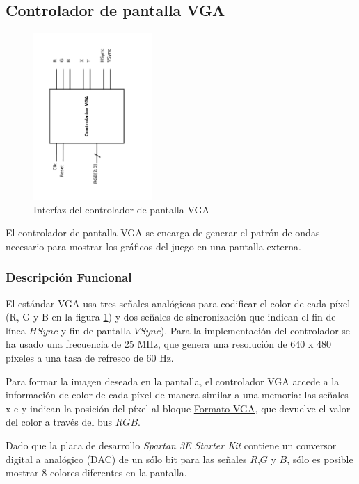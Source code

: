 \subsection{Controlador de pantalla VGA}
\label{vga}

\begin{figure}[H]
	\centering
	\includegraphics[width=0.4\textwidth, angle=-90] {vga_block.pdf}
	\caption{Interfaz del controlador de pantalla VGA}\label{fig:vgaBlock}
\end{figure}

El controlador de pantalla VGA se encarga de generar el patrón de ondas necesario para mostrar los gráficos del juego en una pantalla externa.

\subsubsection{Descripción Funcional}

El estándar VGA usa tres señales analógicas para codificar el color de cada píxel (R, G y B en la figura \ref{fig:vgaBlock}) y dos señales de sincronización que indican el fin de línea $HSync$ y fin de pantalla $VSync$). Para la implementación del controlador se ha usado una frecuencia de 25 MHz, que genera una resolución de 640 x 480 píxeles a una tasa de refresco de 60 Hz.

Para formar la imagen deseada en la pantalla, el controlador VGA accede a la información de color de cada píxel de manera similar a una memoria: las señales x e y indican la posición del píxel al bloque \hyperref[formatoVGA]{Formato VGA}, que devuelve el valor del color a través del bus $RGB$. 

Dado que la placa de desarrollo \emph{Spartan 3E Starter Kit} contiene un conversor digital a analógico (DAC) de un sólo bit para las señales $R$,$G$ y $B$, sólo es posible mostrar 8 colores diferentes en la pantalla.

